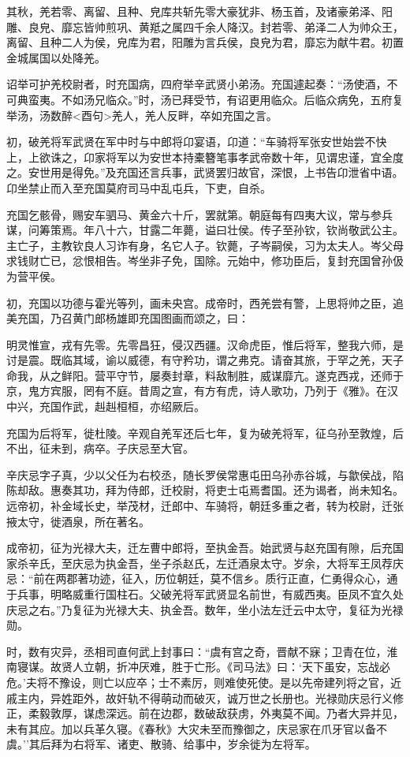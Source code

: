 \documentclass[]{article}
\begin{document}
其秋，羌若零、离留、且种、皃库共斩先零大豪犹非、杨玉首，及诸豪弟泽、阳雕、良皃、靡忘皆帅煎巩、黄羝之属四千余人降汉。封若零、弟泽二人为帅众王，离留、且种二人为侯，皃库为君，阳雕为言兵侯，良皃为君，靡忘为献牛君。初置金城属国以处降羌。

诏举可护羌校尉者，时充国病，四府举辛武贤小弟汤。充国遽起奏：``汤使酒，不可典蛮夷。不如汤兄临众。''时，汤已拜受节，有诏更用临众。后临众病免，五府复举汤，汤数醉\textless{}酉句\textgreater{}羌人，羌人反畔，卒如充国之言。

初，破羌将军武贤在军中时与中郎将卬宴语，卬道：``车骑将军张安世始尝不快上，上欲诛之，卬家将军以为安世本持橐簪笔事孝武帝数十年，见谓忠谨，宜全度之。安世用是得免。''及充国还言兵事，武贤罢归故官，深恨，上书告卬泄省中语。卬坐禁止而入至充国莫府司马中乱屯兵，下吏，自杀。

充国乞骸骨，赐安车驷马、黄金六十斤，罢就第。朝庭每有四夷大议，常与参兵谋，问筹策焉。年八十六，甘露二年薨，谥曰壮侯。传子至孙钦，钦尚敬武公主。主亡子，主教钦良人习诈有身，名它人子。钦薨，子岑嗣侯，习为太夫人。岑父母求钱财亡已，忿恨相告。岑坐非子免，国除。元始中，修功臣后，复封充国曾孙伋为营平侯。

初，充国以功德与霍光等列，画未央宫。成帝时，西羌尝有警，上思将帅之臣，追美充国，乃召黄门郎杨雄即充国图画而颂之，曰：

明灵惟宣，戎有先零。先零昌狂，侵汉西疆。汉命虎臣，惟后将军，整我六师，是讨是震。既临其域，谕以威德，有守矜功，谓之弗克。请奋其旅，于罕之羌，天子命我，从之鲜阳。营平守节，屡奏封章，料敌制胜，威谋靡亢。遂克西戎，还师于京，鬼方宾服，罔有不庭。昔周之宣，有方有虎，诗人歌功，乃列于《雅》。在汉中兴，充国作武，赳赳桓桓，亦绍厥后。

充国为后将军，徙杜陵。辛观自羌军还后七年，复为破羌将军，征乌孙至敦煌，后不出，征未到，病卒。子庆忌至大官。

辛庆忌字子真，少以父任为右校丞，随长罗侯常惠屯田乌孙赤谷城，与歙侯战，陷陈却敌。惠奏其功，拜为侍郎，迁校尉，将吏士屯焉耆国。还为谒者，尚未知名。远帝初，补金域长史，举茂材，迁郎中、车骑将，朝廷多重之者，转为校尉，迁张掖太守，徙酒泉，所在著名。

成帝初，征为光禄大夫，迁左曹中郎将，至执金吾。始武贤与赵充国有隙，后充国家杀辛氏，至庆忌为执金吾，坐子杀赵氏，左迁酒泉太守。岁余，大将军王凤荐庆忌：``前在两郡著功迹，征入，历位朝廷，莫不信乡。质行正直，仁勇得众心，通于兵事，明略威重行国柱石。父破羌将军武贤显名前世，有威西夷。臣凤不宜久处庆忌之右。''乃复征为光禄大夫、执金吾。数年，坐小法左迁云中太守，复征为光禄勋。

时，数有灾异，丞相司直何武上封事曰：``虞有宫之奇，晋献不寐；卫青在位，淮南寝谋。故贤人立朝，折冲厌难，胜于亡形。《司马法》曰：`天下虽安，忘战必危。'夫将不豫设，则亡以应卒；士不素厉，则难使死使。是以先帝建列将之官，近戚主内，异姓距外，故奸轨不得萌动而破灭，诚万世之长册也。光禄勋庆忌行义修正，柔毅敦厚，谋虑深远。前在边郡，数破敌获虏，外夷莫不闻。乃者大异并见，未有其应。加以兵革久寝。《春秋》大灾未至而豫御之，庆忌家在爪牙官以备不虞。''其后拜为右将军、诸吏、散骑、给事中，岁余徙为左将军。
\end{document}
